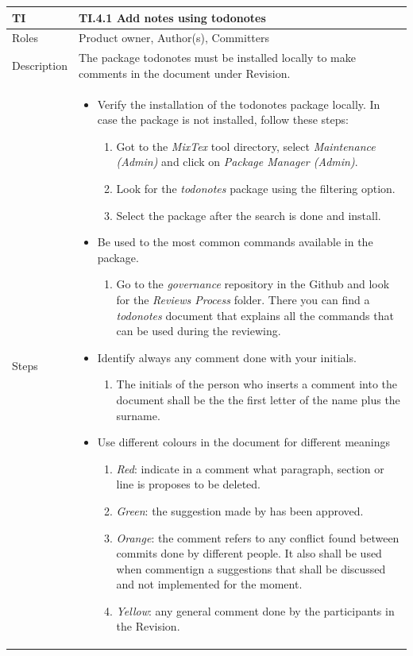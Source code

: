 \documentclass{template/openetcs_article}
\begin{document}
\begin{flushleft}
\tablefirsthead{}
\tablehead{}
\tabletail{}
\tablelasttail{}
\begin{supertabular}{|m{2cm}|m{13cm}|}
\hline
{}
TI & 
TI.4.1 Add notes using todonotes
\\\hline
Roles &
Product owner, Author(s), Committers
\\\hline
Description &
The package todonotes must be installed locally to make comments in the document under Revision. 
\\\hline
Steps &
\begin{itemize}
\item Verify the installation of the todonotes package locally. In case the package is not installed, follow these steps:
\begin{enumerate}
\item Got to the {\it MixTex} tool directory, select {\it Maintenance (Admin)} and click on {\it Package Manager (Admin)}.
\item Look for the {\it todonotes} package using the filtering option.
\item Select the package after the search is done and install.
\end{enumerate}
\item Be used to the most common commands available in the package.
\begin{enumerate}
\item Go to the {\it governance} repository in the Github and look for the {\it Reviews Process} folder. There you can find a {\it todonotes} document that explains all the commands that can be used during the reviewing.
\end{enumerate}
\item Identify always any comment done with your initials.
\begin{enumerate} 
\item The initials of the person who inserts a comment into the document shall be the the first letter of the name plus the surname.
\end{enumerate}
\item Use different colours in the document for different meanings 
\begin{enumerate}
\item {\it Red}: indicate in a comment what paragraph, section or line is proposes to be deleted. 
\item {\it Green}: the suggestion made by has been approved.
\item {\it Orange}: the comment refers to any conflict found between commits done by different people. It also shall be used when commentign a suggestions that shall be discussed and not implemented for the moment.
\item {\it Yellow}: any general comment done by the participants in the Revision. 
\end{enumerate} 
\end{itemize}

\\\hline
\end{supertabular}
\end{flushleft}
\end{document}
